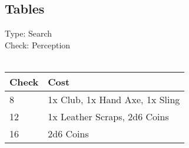 \subsection{Tables}
Type: Search\\
Check: Perception\\
\\
\begin{minipage}{0.8\textwidth}
	\begin{tabular}{|l | l|}
		\hline
		Check & Cost\\
		\hline
		8 & 1x Club, 1x Hand Axe, 1x Sling\\
		12 & 1x Leather Scraps, 2d6 Coins\\
		16 & 2d6 Coins\\
		\hline
	\end{tabular}
\end{minipage}
\pagebreak